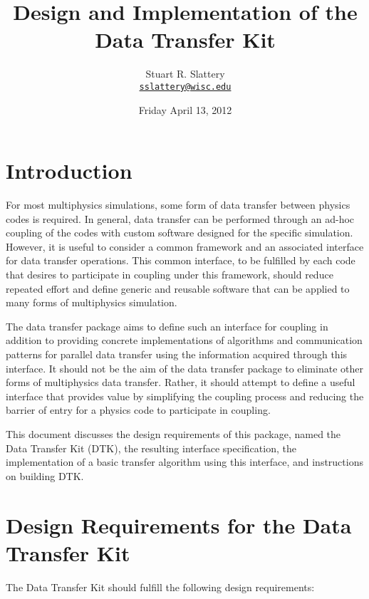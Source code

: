 \documentclass[letterpaper]{article}
\author{Stuart R. Slattery
  \\ \href{mailto:sslattery@wisc.edu}{\texttt{sslattery@wisc.edu}}
}
\date{Friday April 13, 2012}
\title{Design and Implementation of the Data Transfer Kit}
\begin{document}
\maketitle
\newpage

\section{Introduction}
For most multiphysics simulations, some form of data transfer between
physics codes is required. In general, data transfer can be performed
through an ad-hoc coupling of the codes with custom software designed
for the specific simulation. However, it is useful to consider a
common framework and an associated interface for data transfer
operations. This common interface, to be fulfilled by each code that
desires to participate in coupling under this framework, should reduce
repeated effort and define generic and reusable software that can be
applied to many forms of multiphysics simulation.

The data transfer package aims to define such an interface for coupling in
addition to providing concrete implementations of algorithms and
communication patterns for parallel data transfer using the
information acquired through this interface. It should not be the aim
of the data transfer package to eliminate other forms of multiphysics
data transfer. Rather, it should attempt to define a useful interface
that provides value by simplifying the coupling process and reducing
the barrier of entry for a physics code to participate in coupling. 

This document discusses the design requirements of this package, named
the Data Transfer Kit (DTK), the resulting interface specification,
the implementation of a basic transfer algorithm using this interface,
and instructions on building DTK.

\section{Design Requirements for the Data Transfer Kit}
The Data Transfer Kit should fulfill the following design
requirements:
\end{document}
